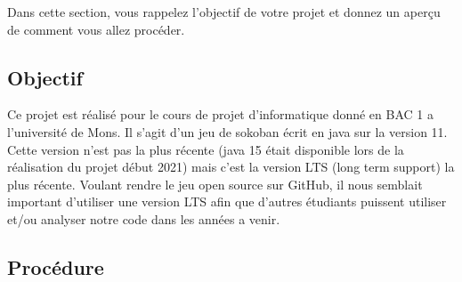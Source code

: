 \documentclass[../main.tex]{subfiles}
\begin{document}
Dans cette section, vous rappelez l'objectif de votre projet et donnez un aperçu de comment vous allez procéder.

\subsection{Objectif}
Ce projet est réalisé pour le cours de projet d'informatique donné en BAC 1 a l'université de Mons.
Il s'agit d'un jeu de sokoban écrit en java sur la version 11.
Cette version n'est pas la plus récente (java 15 était disponible lors de la réalisation du projet début 2021) mais c'est la version LTS (long term support) la plus récente.
Voulant rendre le jeu open source sur GitHub, il nous semblait important d'utiliser une version LTS afin que d'autres étudiants puissent utiliser et/ou analyser notre code dans les années a venir.

\subsection{Procédure}
\end{document}
